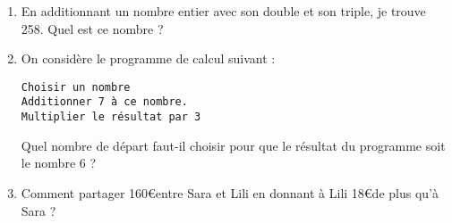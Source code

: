 
\begin{enumerate}
\item En additionnant un nombre entier avec son double et son triple, je trouve 258. Quel est ce nombre ?
\item On considère le programme de calcul suivant :
\begin{verbatim}
Choisir un nombre
Additionner 7 à ce nombre.
Multiplier le résultat par 3
\end{verbatim}
Quel nombre de départ faut-il choisir pour que le résultat du programme soit le nombre 6 ?
\item Comment partager 160\euro entre Sara et Lili en donnant à Lili 18\euro de plus qu’à Sara ?
\end{enumerate}